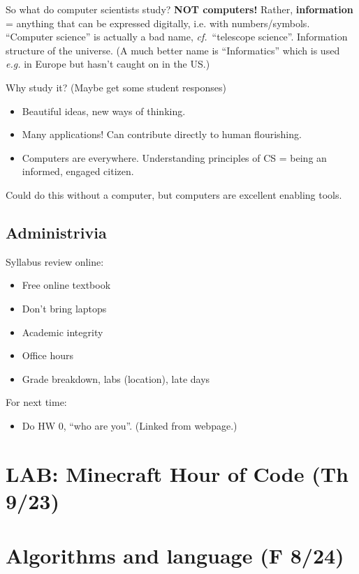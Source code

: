 \documentclass{article}
\newcommand{\eg}{\emph{e.g.}\xspace}
\begin{document}
So what do computer scientists study?  \textbf{NOT computers!}
Rather, \textbf{information} = anything that can be expressed
digitally, i.e. with numbers/symbols.  ``Computer science'' is
actually a bad name, \emph{cf.}\ ``telescope science''.  Information
structure of the universe. (A much better name is ``Informatics''
which is used \eg in Europe but hasn't caught on in the US.)

Why study it?  (Maybe get some student responses)
\begin{itemize}
\item Beautiful ideas, new ways of thinking.
\item Many applications!  Can contribute directly to human flourishing.
\item Computers are everywhere.  Understanding principles of CS =
  being an informed, engaged citizen.
\end{itemize}
Could do this without a computer, but computers are excellent enabling
tools.

\subsection*{Administrivia}

Syllabus review online:
\begin{itemize}
\item Free online textbook
\item Don't bring laptops
\item Academic integrity
\item Office hours
\item Grade breakdown, labs (location), late days
\end{itemize}

For next time:

\begin{itemize}
\item Do HW 0, ``who are you''.  (Linked from webpage.)
\end{itemize}

\newpage
\section*{LAB: Minecraft Hour of Code (Th 9/23)}

\newpage
\section{Algorithms and language (F 8/24)}
\end{document}

